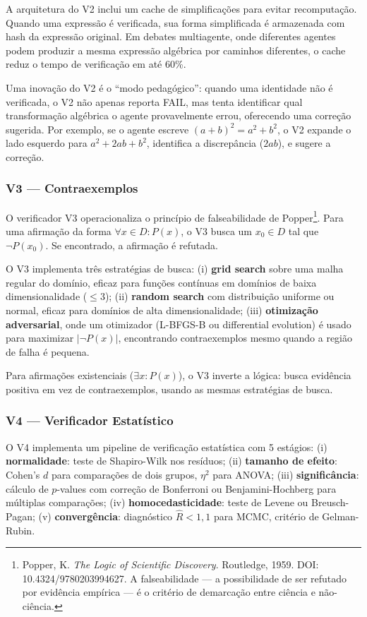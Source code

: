 A arquitetura do V2 inclui um cache de simplificações para evitar recomputação.
Quando uma expressão é verificada, sua forma simplificada é armazenada com
hash da expressão original. Em debates multiagente, onde diferentes agentes
podem produzir a mesma expressão algébrica por caminhos diferentes, o cache
reduz o tempo de verificação em até 60\%.

Uma inovação do V2 é o ``modo pedagógico'': quando uma identidade não é
verificada, o V2 não apenas reporta FAIL, mas tenta identificar qual
transformação algébrica o agente provavelmente errou, oferecendo uma correção
sugerida. Por exemplo, se o agente escreve $(a+b)^2 = a^2 + b^2$, o V2
expande o lado esquerdo para $a^2 + 2ab + b^2$, identifica a discrepância
($2ab$), e sugere a correção.

\subsubsection{V3 — Contraexemplos}

O verificador V3 operacionaliza o princípio de falseabilidade de Popper\footnote{Popper, K. \textit{The Logic of Scientific Discovery}. Routledge, 1959. DOI:
10.4324/9780203994627. A falseabilidade — a possibilidade de ser refutado por
evidência empírica — é o critério de demarcação entre ciência e não-ciência.}.
Para uma afirmação da forma $\forall x \in D: P(x)$, o V3 busca um $x_0 \in D$
tal que $\neg P(x_0)$. Se encontrado, a afirmação é refutada.

O V3 implementa três estratégias de busca: (i) \textbf{grid search} sobre uma
malha regular do domínio, eficaz para funções contínuas em domínios de baixa
dimensionalidade ($\leq 3$); (ii) \textbf{random search} com distribuição
uniforme ou normal, eficaz para domínios de alta dimensionalidade; (iii)
\textbf{otimização adversarial}, onde um otimizador (L-BFGS-B ou differential
evolution) é usado para maximizar $|\neg P(x)|$, encontrando contraexemplos
mesmo quando a região de falha é pequena.

Para afirmações existenciais ($\exists x: P(x)$), o V3 inverte a lógica:
busca evidência positiva em vez de contraexemplos, usando as mesmas
estratégias de busca.

\subsubsection{V4 — Verificador Estatístico}

O V4 implementa um pipeline de verificação estatística com 5 estágios:
(i) \textbf{normalidade}: teste de Shapiro-Wilk nos resíduos; (ii)
\textbf{tamanho de efeito}: Cohen's $d$ para comparações de dois grupos,
$\eta^2$ para ANOVA; (iii) \textbf{significância}: cálculo de $p$-values
com correção de Bonferroni ou Benjamini-Hochberg para múltiplas comparações;
(iv) \textbf{homocedasticidade}: teste de Levene ou Breusch-Pagan; (v)
\textbf{convergência}: diagnóstico $\hat{R} < 1,1$ para MCMC, critério de
Gelman-Rubin.

